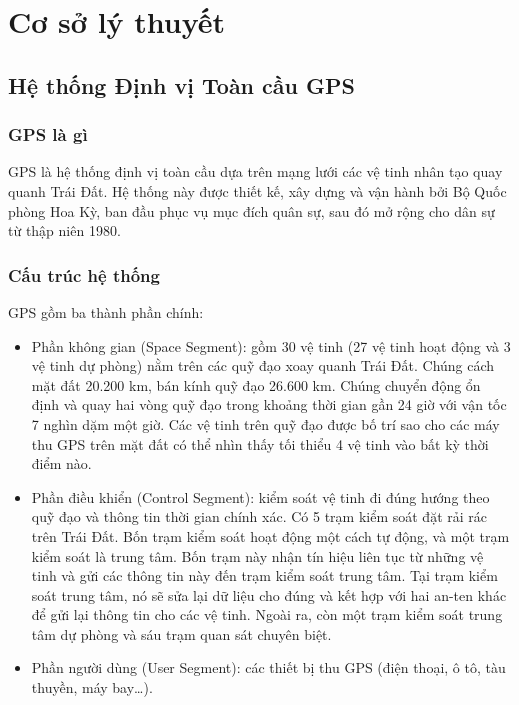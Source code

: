 \section{Cơ sở lý thuyết}
\subsection{Hệ thống Định vị Toàn cầu GPS}
\subsubsection{GPS là gì}
GPS là hệ thống định vị toàn cầu dựa trên mạng lưới các vệ tinh nhân tạo quay quanh Trái Đất. Hệ thống này được thiết kế, xây dựng và vận hành bởi Bộ Quốc phòng Hoa Kỳ, ban đầu phục vụ mục đích quân sự, sau đó mở rộng cho dân sự từ thập niên 1980.

\subsubsection{Cấu trúc hệ thống}
GPS gồm ba thành phần chính:
\begin{itemize}
    \item Phần không gian (Space Segment): gồm 30 vệ tinh (27 vệ tinh hoạt động và 3 vệ tinh dự phòng) nằm trên các quỹ đạo xoay quanh Trái Đất. Chúng cách mặt đất 20.200 km, bán kính quỹ đạo 26.600 km. Chúng chuyển động ổn định và quay hai vòng quỹ đạo trong khoảng thời gian gần 24 giờ với vận tốc 7 nghìn dặm một giờ. Các vệ tinh trên quỹ đạo được bố trí sao cho các máy thu GPS trên mặt đất có thể nhìn thấy tối thiểu 4 vệ tinh vào bất kỳ thời điểm nào.
    \item Phần điều khiển (Control Segment): kiểm soát vệ tinh đi đúng hướng theo quỹ đạo và thông tin thời gian chính xác. Có 5 trạm kiểm soát đặt rải rác trên Trái Đất. Bốn trạm kiểm soát hoạt động một cách tự động, và một trạm kiểm soát là trung tâm. Bốn trạm này nhận tín hiệu liên tục từ những vệ tinh và gửi các thông tin này đến trạm kiểm soát trung tâm. Tại trạm kiểm soát trung tâm, nó sẽ sửa lại dữ liệu cho đúng và kết hợp với hai an-ten khác để gửi lại thông tin cho các vệ tinh. Ngoài ra, còn một trạm kiểm soát trung tâm dự phòng và sáu trạm quan sát chuyên biệt.
    \item Phần người dùng (User Segment): các thiết bị thu GPS (điện thoại, ô tô, tàu thuyền, máy bay…).
\end{itemize}

